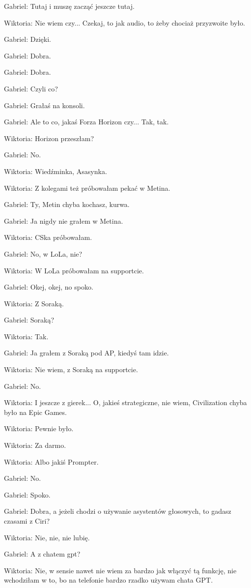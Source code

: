 Gabriel: Tutaj i muszę zacząć jeszcze tutaj.

Wiktoria: Nie wiem czy... Czekaj, to jak audio, to żeby chociaż przyzwoite było.

Gabriel: Dzięki.

Gabriel: Dobra.

Gabriel: Dobra.

Gabriel: Czyli co?

Gabriel: Grałaś na konsoli.

Gabriel: Ale to co, jakaś Forza Horizon czy... Tak, tak.

Wiktoria: Horizon przeszłam?

Gabriel: No.

Wiktoria: Wiedźminka, Asasynka.

Wiktoria: Z kolegami też próbowałam pekać w Metina.

Gabriel: Ty, Metin chyba kochasz, kurwa.

Gabriel: Ja nigdy nie grałem w Metina.

Wiktoria: CSka próbowałam.

Gabriel: No, w LoLa, nie?

Wiktoria: W LoLa próbowałam na supportcie.

Gabriel: Okej, okej, no spoko.

Wiktoria: Z Soraką.

Gabriel: Soraką?

Wiktoria: Tak.

Gabriel: Ja grałem z Soraką pod AP, kiedyś tam idzie.

Wiktoria: Nie wiem, z Soraką na supportcie.

Gabriel: No.

Wiktoria: I jeszcze z gierek... O, jakieś strategiczne, nie wiem, Civilization chyba było na Epic Games.

Wiktoria: Pewnie było.

Wiktoria: Za darmo.

Wiktoria: Albo jakiś Prompter.

Gabriel: No.

Gabriel: Spoko.

Gabriel: Dobra, a jeżeli chodzi o używanie asystentów głosowych, to gadasz czasami z Ciri?

Wiktoria: Nie, nie, nie lubię.

Gabriel: A z chatem gpt?

Wiktoria: Nie, w sensie nawet nie wiem za bardzo jak włączyć tą funkcję, nie wchodziłam w to, bo na telefonie bardzo rzadko używam chata GPT.

